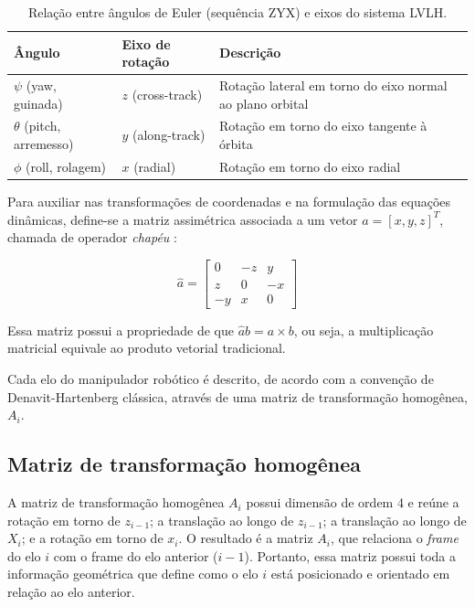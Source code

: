 \begin{table}[ht]
    \centering
    \footnotesize
    \caption{Relação entre ângulos de Euler (sequência ZYX) e eixos do sistema LVLH.}
    \label{tab:euler_LVLH}
    \begin{tabular}{lll}
        \hline
        \textbf{Ângulo} & \textbf{Eixo de rotação} & \textbf{Descrição} \\
        \hline
        $\psi$ (yaw, guinada)
        & $z$ (cross-track)
        & Rotação lateral em torno do eixo normal ao plano orbital \\

        $\theta$ (pitch, arremesso)
        & $y$ (along-track)
        & Rotação em torno do eixo tangente à órbita \\

        $\phi$ (roll, rolagem)
        & $x$ (radial)
        & Rotação em torno do eixo radial \\
        \hline
    \end{tabular}
\end{table}

Para auxiliar nas transformações de coordenadas e na formulação das equações dinâmicas, define-se a matriz assimétrica associada a um vetor $a = [x, y, z]^T$, chamada de operador \emph{chapéu} \cite{murray1994mathematical}:

\begin{equation}
    \label{eq:matriz_assimetrica}
    \hat{a} = 
    \begin{bmatrix}
        0   & -z  &  y \\
        z   &  0  & -x \\
        -y  &  x  &  0
    \end{bmatrix}
\end{equation}

Essa matriz possui a propriedade de que $\hat{a} b = a \times b$, ou seja, a multiplicação matricial equivale ao produto vetorial tradicional.


Cada elo do manipulador robótico é descrito, de acordo com a convenção de Denavit-Hartenberg clássica, através de uma matriz de transformação homogênea, $A_i$. 
\subsection{Matriz de transformação homogênea}

A matriz de transformação homogênea $A_i$ possui dimensão de ordem 4 e reúne a rotação em torno de $z_{i-1}$; a translação ao longo de $z_{i-1}$; a translação ao longo de $X_{i}$; e a rotação em torno de $x_{i}$. O resultado é a matriz $A_i$, que relaciona o \emph{frame} do elo $i$ com o frame do elo anterior ($i-1$).
Portanto, essa matriz possui toda a informação geométrica que define como o elo $i$ está posicionado e orientado em relação ao elo anterior.

